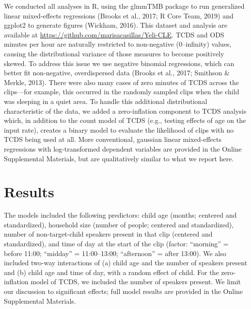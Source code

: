 \documentclass[
  english,
  ,man,floatsintext]{apa6}
\begin{document}
We conducted all analyses in R, using the glmmTMB package to run generalized linear mixed-effects regressions (Brooks et al., 2017; R Core Team, 2019) and ggplot2 to generate figures (Wickham, 2016). This dataset and analysis are available at \url{https://github.com/marisacasillas/Yeli-CLE}. TCDS and ODS minutes per hour are naturally restricted to non-negative (0--infinity) values, causing the distributional variance of those measures to become positively skewed. To address this issue we use negative binomial regressions, which can better fit non-negative, overdispersed data (Brooks et al., 2017; Smithson \& Merkle, 2013). There were also many cases of zero minutes of TCDS across the clips---for example, this occurred in the randomly sampled clips when the child was sleeping in a quiet area. To handle this additional distributional characteristic of the data, we added a zero-inflation component to TCDS analysis which, in addition to the count model of TCDS (e.g., testing effects of age on the input rate), creates a binary model to evaluate the likelihood of clips with no TCDS being used at all. More conventional, gaussian linear mixed-effects regressions with log-transformed dependent variables are provided in the Online Supplemental Materials, but are qualitatively similar to what we report here.

\hypertarget{results}{%
\section{Results}\label{results}}

The models included the following predictors: child age (months; centered and standardized), household size (number of people; centered and standardized), number of non-target-child speakers present in that clip (centered and standardized), and time of day at the start of the clip (factor: \enquote{morning} = before 11:00; \enquote{midday} = 11:00--13:00; \enquote{afternoon} = after 13:00). We also included two-way interactions of (a) child age and the number of speakers present and (b) child age and time of day, with a random effect of child. For the zero-inflation model of TCDS, we included the number of speakers present. We limit our discussion to significant effects; full model results are provided in the Online Supplemental Materials.
\end{document}
